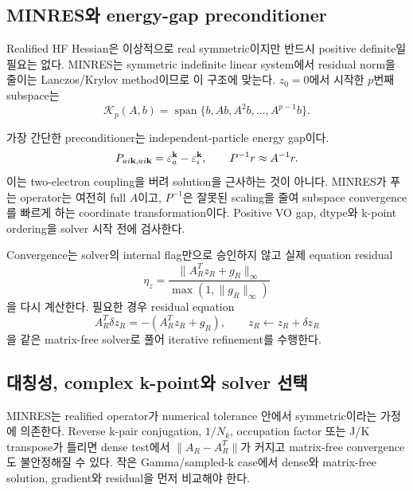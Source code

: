 \subsection{MINRES와 energy-gap preconditioner}

Realified HF Hessian은 이상적으로 real symmetric이지만 반드시 positive definite일
필요는 없다. MINRES는 symmetric indefinite linear system에서 residual norm을 줄이는
Lanczos/Krylov method이므로 이 구조에 맞는다. $z_0=0$에서 시작한 $p$번째 subspace는
\begin{equation}
  \mathcal K_p(A,b)
  =\operatorname{span}\{b,Ab,A^2b,\ldots,A^{p-1}b\}.
  \label{eq:minres-krylov}
\end{equation}

가장 간단한 preconditioner는 independent-particle energy gap이다.
\begin{equation}
  P_{ai\mathbf{k},ai\mathbf{k}}=\varepsilon_a^{\mathbf{k}}-\varepsilon_i^{\mathbf{k}},
  \qquad P^{-1}r\approx A^{-1}r.
  \label{eq:gap-preconditioner}
\end{equation}
이는 two-electron coupling을 버려 solution을 근사하는 것이 아니다. MINRES가 푸는
operator는 여전히 full $A$이고, $P^{-1}$은 잘못된 scaling을 줄여 subspace convergence를
빠르게 하는 coordinate transformation이다. Positive VO gap, dtype와 k-point ordering을
solver 시작 전에 검사한다.

Convergence는 solver의 internal flag만으로 승인하지 않고 실제 equation residual
\begin{equation}
  \eta_z
  =\frac{\|A_R^Tz_R+g_R\|_\infty}
         {\max(1,\|g_R\|_\infty)}
  \label{eq:scaled-z-residual}
\end{equation}
을 다시 계산한다. 필요한 경우 residual equation
\begin{equation}
  A_R^T\delta z_R=-\left(A_R^Tz_R+g_R\right),
  \qquad z_R\leftarrow z_R+\delta z_R
  \label{eq:iterative-refinement}
\end{equation}
을 같은 matrix-free solver로 풀어 iterative refinement를 수행한다.

\subsection{대칭성, complex k-point와 solver 선택}

MINRES는 realified operator가 numerical tolerance 안에서 symmetric이라는 가정에
의존한다. Reverse k-pair conjugation, $1/N_k$, occupation factor 또는 J/K transpose가
틀리면 dense test에서 $\|A_R-A_R^T\|$가 커지고 matrix-free convergence도 불안정해질 수
있다. 작은 Gamma/sampled-k case에서 dense와 matrix-free solution, gradient와 residual을
먼저 비교해야 한다.

